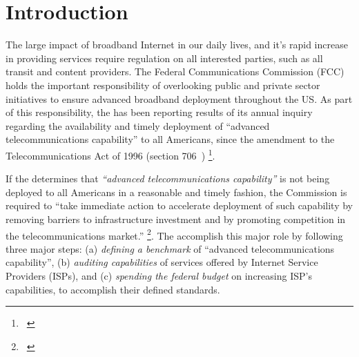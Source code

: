 \section{Introduction}
\label{sec:intro}



The large impact of broadband Internet in our daily lives, and it’s rapid increase in providing
services require regulation on all interested parties, such as all transit and content providers.
The Federal Communications Commission (FCC) holds the important responsibility of overlooking public
and private sector initiatives to ensure advanced broadband deployment throughout the US. As part of
this responsibility, the \FCC has been reporting results of its annual inquiry regarding the
availability and timely deployment of ``advanced telecommunications capability'' to all Americans,
since the amendment to the Telecommunications Act of 1996 (section 706~\cite{fcc1996telecom-act})
\footnote{ ~\cite{fcc2015progress-report}}.


If the \FCC determines that \emph{``advanced telecommunications capability''} is not being deployed
to all Americans in a reasonable and timely fashion, the Commission is required to ``take immediate
action to accelerate deployment of such capability by removing barriers to infrastructure investment
and by promoting competition in the telecommunications market.'' \footnote{
~\cite{fcc2015progress-report}}. The \FCC accomplish this major role by following three major steps:
(a) \emph{defining a benchmark} of ``advanced telecommunications capability'', (b) \emph{auditing
capabilities} of services offered by Internet Service Providers (ISPs), and (c) \emph{spending the
federal budget} on increasing ISP’s capabilities, to accomplish their defined standards.

